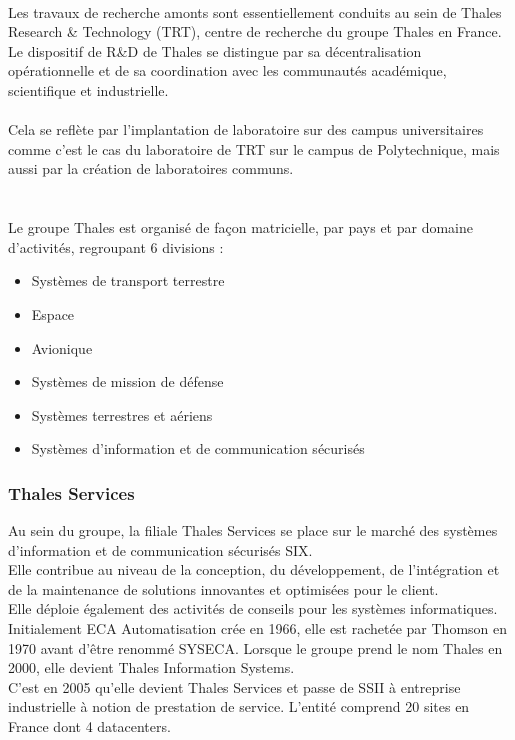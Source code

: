 \documentclass[12pt]{article}
\begin{document}
\\
Les travaux de recherche amonts sont essentiellement conduits au sein de Thales Research \& Technology (TRT), centre de recherche du groupe Thales en France. Le dispositif de R\&D de Thales se distingue par sa décentralisation opérationnelle et de sa coordination avec les communautés académique, scientifique et industrielle.\\
\\
Cela se reflète par l'implantation de laboratoire sur des campus universitaires comme c'est le cas du laboratoire de TRT sur le campus de Polytechnique, mais aussi par la création de laboratoires communs.\\
\\
\\
Le groupe Thales est organisé de façon matricielle, par pays et par domaine d'activités, regroupant 6 divisions :
\begin{itemize}
\item Systèmes de transport terrestre
\item Espace
\item Avionique
\item Systèmes de mission de défense
\item Systèmes terrestres et aériens
\item Systèmes d'information et de communication sécurisés
\end{itemize}

\subsubsection{Thales Services}
Au sein du groupe, la filiale Thales Services se place sur le marché des systèmes d'information et de communication sécurisés SIX.\\
Elle contribue au niveau de la conception, du développement, de l'intégration et de la maintenance de solutions innovantes et optimisées pour le client.\\
Elle déploie également des activités de conseils pour les systèmes informatiques.\\
Initialement ECA Automatisation crée en 1966, elle est rachetée par Thomson en 1970 avant d'être renommé SYSECA. Lorsque le groupe prend le nom Thales en 2000, elle devient Thales Information Systems.\\
C'est en 2005 qu'elle devient Thales Services et passe de SSII à entreprise industrielle à notion de prestation de service. L'entité comprend 20 sites en France dont 4 datacenters.
\end{document}
